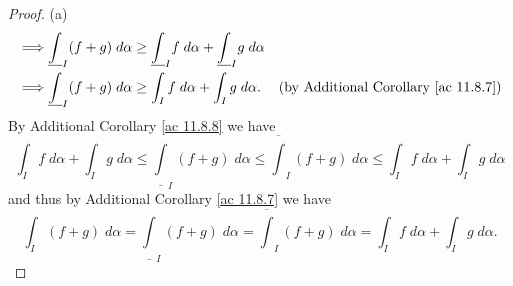 \begin{proof}{(a)}
\begin{align*}
        \implies & \underline{\int}_I (f + g) \; d \alpha \geq \underline{\int}_I f \; d \alpha + \underline{\int}_I g \; d \alpha &                                                     \\
        \implies & \underline{\int}_I (f + g) \; d \alpha \geq \int_I f \; d \alpha + \int_I g \; d \alpha.                        & \text{(by Additional Corollary \ref{ac 11.8.7})}
    \end{align*}
    By Additional Corollary \ref{ac 11.8.8} we have
    \[
        \int_I f \; d \alpha + \int_I g \; d \alpha \leq \underline{\int}_I (f + g) \; d \alpha \leq \overline{\int}_I (f + g) \; d \alpha \leq \int_I f \; d \alpha + \int_I g \; d \alpha
    \]
    and thus by Additional Corollary \ref{ac 11.8.7} we have
    \[
        \int_I (f + g) \; d \alpha = \underline{\int}_I (f + g) \; d \alpha = \overline{\int}_I (f + g) \; d \alpha = \int_I f \; d \alpha + \int_I g \; d \alpha.
    \]
\end{proof}

